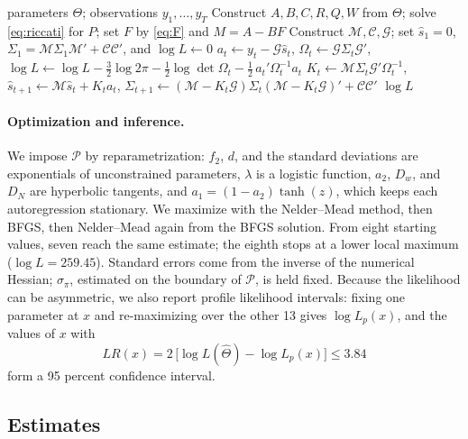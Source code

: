 \documentclass[12pt]{article}
\begin{document}
\begin{algorithm}[!htb]
\caption{Evaluating the log likelihood $\log L(\Theta)$}\label{alg:loglik}
\begin{algorithmic}[1]
\Require parameters $\Theta$; observations $y_1, \dots, y_T$
\State Construct $A, B, C, R, Q, W$ from $\Theta$; solve \eqref{eq:riccati} for $P$; set $F$ by \eqref{eq:F} and $M = A - BF$
\State Construct $\mathcal{M}, \mathcal{C}, \mathcal{G}$; set $\hat{s}_1 = 0$, $\Sigma_1 = \mathcal{M}\Sigma_1\mathcal{M}' + \mathcal{C}\mathcal{C}'$, and $\log L \gets 0$
  \State $a_t \gets y_t - \mathcal{G}\hat{s}_t$, \quad $\Omega_t \gets \mathcal{G}\Sigma_t\mathcal{G}'$, \quad $\log L \gets \log L - \tfrac{3}{2}\log 2\pi - \tfrac12 \log\det\Omega_t - \tfrac12\, a_t'\Omega_t^{-1}a_t$
  \State $K_t \gets \mathcal{M}\Sigma_t\mathcal{G}'\Omega_t^{-1}$, \quad $\hat{s}_{t+1} \gets \mathcal{M}\hat{s}_t + K_t a_t$, \quad $\Sigma_{t+1} \gets (\mathcal{M} - K_t\mathcal{G})\Sigma_t(\mathcal{M} - K_t\mathcal{G})' + \mathcal{C}\mathcal{C}'$
\EndFor
\State \Return $\log L$
\end{algorithmic}
\end{algorithm}

\paragraph{Optimization and inference.} We impose $\mathcal{P}$ by reparametrization: $f_2$, $d$, and the standard deviations are exponentials of unconstrained parameters, $\lambda$ is a logistic function, $a_2$, $D_w$, and $D_N$ are hyperbolic tangents, and $a_1 = (1 - a_2)\tanh(z)$, which keeps each autoregression stationary. We maximize with the Nelder--Mead method, then BFGS, then Nelder--Mead again from the BFGS solution. From eight starting values, seven reach the same estimate; the eighth stops at a lower local maximum ($\log L = 259.45$). Standard errors come from the inverse of the numerical Hessian; $\sigma_\pi$, estimated on the boundary of $\mathcal{P}$, is held fixed. Because the likelihood can be asymmetric, we also report profile likelihood intervals: fixing one parameter at $x$ and re-maximizing over the other 13 gives $\log L_p(x)$, and the values of $x$ with
\begin{equation}\label{eq:profile}
  LR(x) = 2\,\big[\log L(\hat\Theta) - \log L_p(x)\big] \le 3.84
\end{equation}
form a 95 percent confidence interval.

\subsection{Estimates}\label{sec:estimates}
\end{document}
